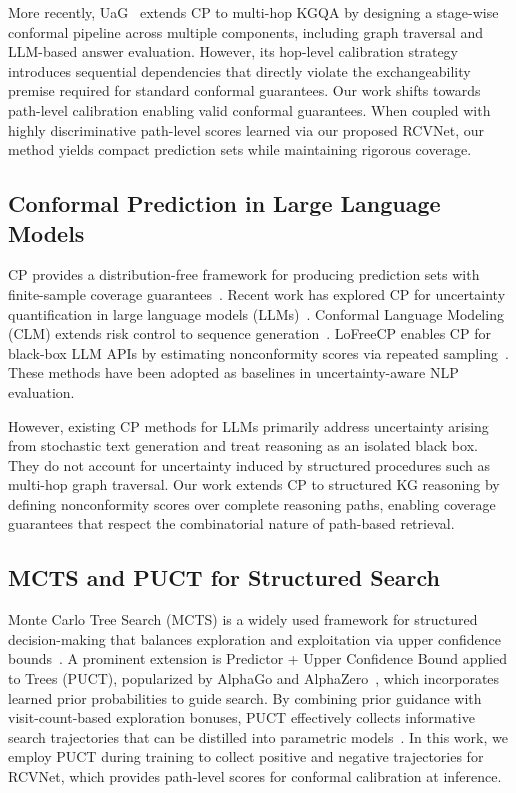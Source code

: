 \documentclass{article}
\theoremstyle{plain}
\theoremstyle{definition}
\theoremstyle{remark}
\begin{document}
More recently, UaG~\citep{Ni_Wang_Cheng_Blasch_Derr_2025} extends CP to multi-hop KGQA by designing a stage-wise conformal pipeline across multiple components, including graph traversal and LLM-based answer evaluation. %
However, its hop-level calibration strategy 
introduces sequential dependencies that directly violate the exchangeability premise required for standard conformal guarantees. Our work shifts towards path-level calibration enabling valid conformal guarantees. When coupled with highly discriminative path-level scores learned via our proposed RCVNet, our method yields compact prediction sets while maintaining rigorous coverage.


\subsection{Conformal Prediction in  Large Language Models}

CP provides a distribution-free framework for producing prediction sets with finite-sample coverage guarantees~\citep{cp_intro}. Recent work has explored CP for uncertainty quantification in large language models (LLMs)~\citep{Geng2023ASOA}. Conformal Language Modeling (CLM) extends risk control to sequence generation~\citep{quach2024conformallanguagemodeling}. LoFreeCP enables CP for black-box LLM APIs by estimating nonconformity scores via repeated sampling~\citep{Su2024}. These methods have been adopted as baselines in uncertainty-aware NLP evaluation.

However, existing CP methods for LLMs primarily address uncertainty arising from stochastic text generation and treat reasoning as an isolated black box. They do not account for uncertainty induced by structured procedures such as multi-hop graph traversal. Our work extends CP to structured KG reasoning by defining nonconformity scores over complete reasoning paths, enabling coverage guarantees that respect the combinatorial nature of path-based retrieval.

\subsection{MCTS and PUCT for Structured Search}
Monte Carlo Tree Search (MCTS) is a widely used framework for structured decision-making that balances exploration and exploitation via upper confidence bounds~\citep{UCT,MCTS_Review}. A prominent extension is Predictor + Upper Confidence Bound applied to Trees (PUCT), popularized by AlphaGo and AlphaZero~\citep{AlphaZero-PUCT,PUCT}, which incorporates learned prior probabilities to guide search. By combining prior guidance with visit-count-based exploration bonuses, PUCT effectively collects informative search trajectories that can be distilled into parametric models~\citep{AlphaZero-PUCT}.
In this work, we employ PUCT during training to collect positive and negative trajectories for RCVNet, which provides path-level scores for conformal calibration at inference.
\end{document}
